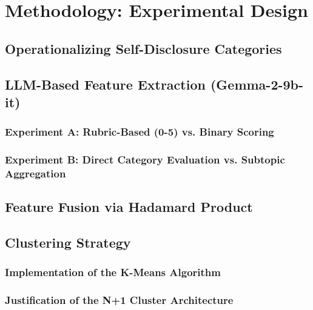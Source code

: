 \section{Methodology: Experimental Design}
    \subsection{Operationalizing Self-Disclosure Categories}
    \subsection{LLM-Based Feature Extraction (Gemma-2-9b-it)}
        \subsubsection{Experiment A: Rubric-Based (0-5) vs. Binary Scoring}
        \subsubsection{Experiment B: Direct Category Evaluation vs. Subtopic Aggregation}
    \subsection{Feature Fusion via Hadamard Product}
    \subsection{Clustering Strategy}
        \subsubsection{Implementation of the K-Means Algorithm}
        \subsubsection{Justification of the N+1 Cluster Architecture}